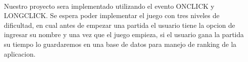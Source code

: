 \documentclass[../documentacion_buscaminas2013.tex]{subfiles}
\begin{document}
\paragraph{ }
Nuestro proyecto sera implementado utilizando el evento ONCLICK y LONGCLICK. Se espera poder implementar el juego con tres niveles de dificultad, en cual antes de empezar una partida el usuario tiene la opcion de ingresar su nombre y una vez que el juego empieza, si el usuario gana la partida su tiempo lo guardaremos en una base de datos para manejo de ranking de la aplicacion.

\clearpage
\end{document}
